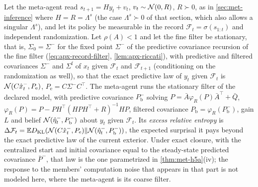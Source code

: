 Let the meta-agent read $s_{t+1}=Hy_t+v_t$, $v_t\sim\mathcal{N}(0,R)$, $R\succ0$, as in \cref{sec:met-inference} where $H=R=\Lambda^s$ (the case $\Lambda^s\succ0$ of that section, which also allows a singular $\Lambda^s$), and let its policy be measurable in the record $\mathcal F_t=\sigma(s_{1:t})$ and independent randomization. Let $\rho(A)<1$ and let the fine filter be stationary, that is, $\Sigma_0=\Sigma^-$ for the fixed point $\Sigma^-$ of the predictive covariance recursion of the fine filter (\cref{eq:apx-record-filter}, \cref{lem:apx-riccati}), with predictive and filtered covariances $\Sigma^-$ and $\Sigma^{\mathrm f}$ of $x_t$ given $\mathcal F_t$ and $\mathcal F_{t+1}$ (conditioning on the randomization as well), so that the exact predictive law of $y_t$ given $\mathcal F_t$ is $\mathcal{N}(C\hat x^-_t,P_{\mathrm e})$, $P_{\mathrm e}=C\Sigma^-C^\top$. The meta-agent runs the stationary filter of the declared model, with predictive covariance $P^-_{\mathrm b}$ solving $P=\bar A\varphi_R(P)\bar A^\top+\bar Q$, $\varphi_R(P)=P-PH^\top(HPH^\top+R)^{-1}HP$, filtered covariance $P_{\mathrm b}=\varphi_R(P^-_{\mathrm b})$, gain $L$ and belief $\mathcal{N}(\hat\eta^-_t,P^-_{\mathrm b})$ about $y_t$ given $\mathcal F_t$. Its \emph{excess relative entropy} is $\Delta\mathcal F_t=\mathbb{E}D_{\mathrm{KL}}(\mathcal{N}(C\hat x^-_t,P_{\mathrm e})\Vert\mathcal{N}(\hat\eta^-_t,P^-_{\mathrm b}))$, the expected surprisal it pays beyond the exact predictive law of the current exterior. Under exact closure, with the centralized start and initial covariance equal to the steady-state predicted covariance $\bar P^-$, that law is the one parametrized in \cref{thm:met-h5a}(iv); the response to the members' computation noise that appears in that part is not modeled here, where the meta-agent is its coarse filter.

